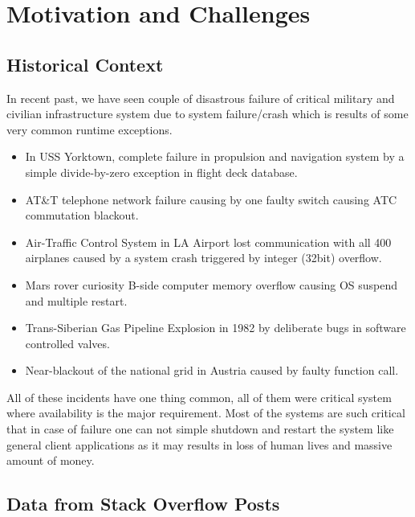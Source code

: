 
\chapter{Motivation and Challenges}
\label{chapter:motivation}


\section{Historical Context}
\label{section:historicalContext}

In recent past, we have seen couple of disastrous failure of critical military
and civilian infrastructure system due to system failure/crash which is results
of some very common runtime exceptions.

\begin{itemize}
  
  \item In USS Yorktown, complete failure in propulsion and navigation system by
  a simple divide-by-zero exception in flight deck database.
  
  \item AT\&T telephone network failure causing by one faulty switch causing ATC
  commutation blackout.
  
  \item Air-Traffic Control System in LA Airport lost communication with all 400
  airplanes caused by a system crash triggered by integer (32bit) overflow.
  
  \item Mars rover curiosity B-side computer memory overflow causing OS suspend
  and multiple restart.
  
  \item Trans-Siberian Gas Pipeline Explosion in 1982 by deliberate bugs in
  software controlled valves.
  
  \item Near-blackout of the national grid in Austria caused by faulty function
  call.
  
\end{itemize}

All of these incidents have one thing common, all of them were critical system
where availability is the major requirement. Most of the systems are such
critical that in case of failure one can not simple shutdown and restart the
system like general client applications as it may results in loss of human lives
and massive amount of money.

\section{Data from Stack Overflow Posts}
\label{section:stackoverflow}

